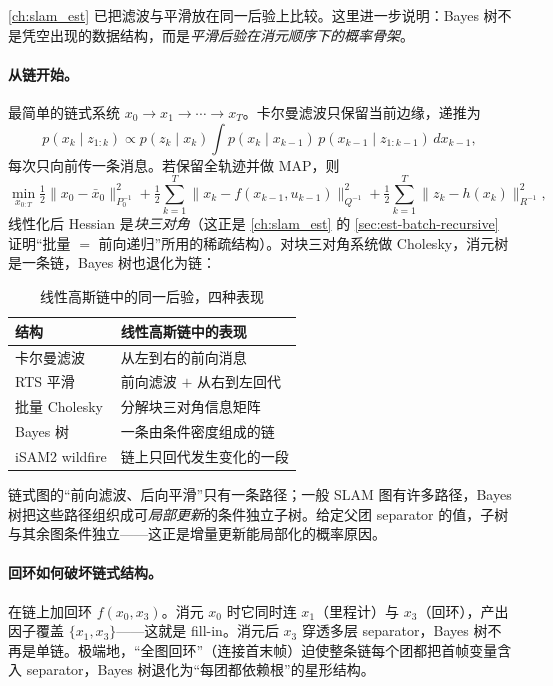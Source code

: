 \cref{ch:slam_est} 已把滤波与平滑放在同一后验上比较。这里进一步说明：Bayes 树不是凭空出现的数据结构，而是\emph{平滑后验在消元顺序下的概率骨架}。

\paragraph{从链开始。}
最简单的链式系统 $x_0\to x_1\to\cdots\to x_T$。卡尔曼滤波只保留当前边缘，递推为
\begin{equation}
  p(x_k\mid z_{1:k})\propto p(z_k\mid x_k)\int p(x_k\mid x_{k-1})\,p(x_{k-1}\mid z_{1:k-1})\,dx_{k-1},
  \label{eq:kf-recursion}
\end{equation}
每次只向前传一条消息。若保留全轨迹并做 MAP，则
\begin{equation}
  \min_{x_{0:T}}\tfrac12\|x_0-\bar x_0\|^2_{P_0^{-1}}
  +\tfrac12\sum_{k=1}^{T}\|x_k-f(x_{k-1},u_{k-1})\|^2_{Q^{-1}}
  +\tfrac12\sum_{k=1}^{T}\|z_k-h(x_k)\|^2_{R^{-1}},
  \label{eq:chain-map}
\end{equation}
线性化后 Hessian 是\emph{块三对角}（这正是 \cref{ch:slam_est} 的 \cref{sec:est-batch-recursive} 证明“批量 $=$ 前向递归”所用的稀疏结构）。对块三对角系统做 Cholesky，消元树是一条链，Bayes 树也退化为链：

\begin{table}[H]\centering\small
\caption{线性高斯链中的同一后验，四种表现}
\label{tab:chain-views}
\begin{tabular}{ll}
\toprule
结构 & 线性高斯链中的表现 \\
\midrule
卡尔曼滤波 & 从左到右的前向消息 \\
RTS 平滑 & 前向滤波 $+$ 从右到左回代 \\
批量 Cholesky & 分解块三对角信息矩阵 \\
Bayes 树 & 一条由条件密度组成的链 \\
iSAM2 wildfire & 链上只回代发生变化的一段 \\
\bottomrule
\end{tabular}
\end{table}

\begin{insight}[Bayes 树 $=$ RTS 平滑在一般稀疏图上的推广]
链式图的“前向滤波、后向平滑”只有一条路径；一般 SLAM 图有许多路径，Bayes 树把这些路径组织成可\emph{局部更新}的条件独立子树。给定父团 separator 的值，子树与其余图条件独立——这正是增量更新能局部化的概率原因。
\end{insight}

\paragraph{回环如何破坏链式结构。}
在链上加回环 $f(x_0,x_3)$。消元 $x_0$ 时它同时连 $x_1$（里程计）与 $x_3$（回环），产出因子覆盖 $\{x_1,x_3\}$——这就是 fill-in。消元后 $x_3$ 穿透多层 separator，Bayes 树不再是单链。极端地，“全图回环”（连接首末帧）迫使整条链每个团都把首帧变量含入 separator，Bayes 树退化为“每团都依赖根”的星形结构。


